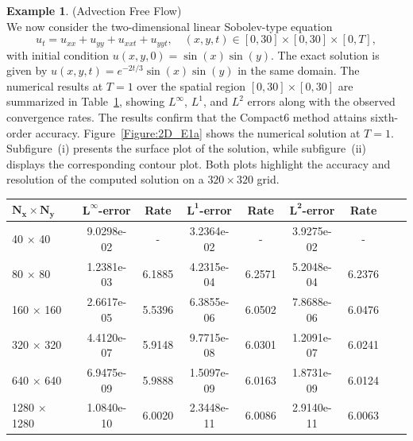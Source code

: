 \documentclass[11pt,a4paper]{amsart}
\theoremstyle{plain}
\theoremstyle{definition}
\newtheorem{example}[theorem]{Example}
\theoremstyle{remark}
\numberwithin{equation}{section}
\begin{document}
\begin{example}
\normalfont
(Advection Free Flow) \\
We now consider the two-dimensional linear Sobolev-type equation
\begin{equation}\label{example:2D_1}
    u_t = u_{xx} + u_{yy} + u_{xxt} + u_{yyt}, \quad (x,y,t) \in [0,30] \times [0,30] \times [0, T],
\end{equation}
with initial condition $u(x,y,0) = \sin(x)\sin(y)$. The exact solution is given by $u(x,y,t) = e^{-2t/3}\sin(x)\sin(y)$ in the same domain. The numerical results at $T = 1$ over the spatial region $[0, 30] \times [0, 30]$ are summarized in Table~\ref{Table:2D_E1a}, showing $L^{\infty}$, $L^{1}$, and $L^{2}$ errors along with the observed convergence rates. The results confirm that the Compact6 method attains sixth-order accuracy. Figure~\ref{Figure:2D_E1a} shows the numerical solution at $T = 1$. Subfigure~(i) presents the surface plot of the solution, while subfigure~(ii) displays the corresponding contour plot. Both plots highlight the accuracy and resolution of the computed solution on a $320 \times 320$ grid.

\begin{table}[htbp!]
\centering
{}
\setlength{\tabcolsep}{0pt}
\begin{tabular*}{\textwidth}{@{\extracolsep{\fill}} l *{8}{c} }
\toprule
 $\boldsymbol{\textbf{N}_x \times \textbf{N}_y}$ & $\boldsymbol{L^{\infty}}$\textbf{-error} & \textbf{Rate} & $\boldsymbol{L^{1}}$\textbf{-error} & \textbf{Rate} & $\boldsymbol{L^{2}}$\textbf{-error} & \textbf{Rate}\\
\midrule
 40 $\times$ 40 & 9.0298e-02 & - & 3.2364e-02 & -& 3.9275e-02 & - \\
80 $\times$ 80& 1.2381e-03 & 6.1885 & 4.2315e-04 & 6.2571& 5.2048e-04 & 6.2376 \\
160 $\times$ 160& 2.6617e-05 & 5.5396 & 6.3855e-06 & 6.0502& 7.8688e-06 & 6.0476 \\
320 $\times$ 320& 4.4120e-07 & 5.9148 & 9.7715e-08 & 6.0301& 1.2091e-07 & 6.0241 \\
640 $\times$ 640& 6.9475e-09 & 5.9888 & 1.5097e-09 & 6.0163& 1.8731e-09 & 6.0124 \\
1280 $\times$ 1280& 1.0840e-10 & 6.0020 & 2.3448e-11 & 6.0086& 2.9140e-11 & 6.0063 \\
\bottomrule
\end{tabular*}
\label{Table:2D_E1a}
\end{table}


\end{example}
\end{document}
